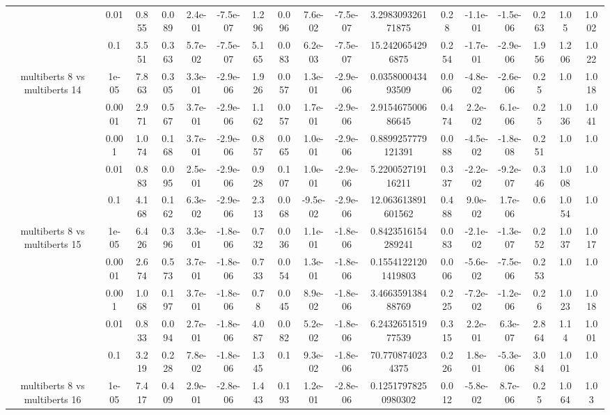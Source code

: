 \begin{tabular}{|c|c|c|c|c|c|c|c|c|c|c|c|c|c|c|c|c|}
 & 0.01 & 0.855 & 0.089 & 2.4e-01 & -7.5e-07 & 1.296 & 0.096 & 7.6e-02 & -7.5e-07 & 3.298309326171875 & 0.28 & -1.1e-01 & -1.5e-06 & 0.263 & 1.05 & 1.002 \\
 & 0.1 & 3.551 & 0.363 & 5.7e-02 & -7.5e-07 & 5.165 & 0.083 & 6.2e-03 & -7.5e-07 & 15.2420654296875 & 0.254 & -1.7e-01 & -2.9e-06 & 1.956 & 1.206 & 1.022 \\
\hline
\multirow{5}{*}{multiberts 8 vs multiberts 14} & 1e-05 & 7.863 & 0.305 & 3.3e-01 & -2.9e-06 & 1.926 & 0.057 & 1.3e-01 & -2.9e-06 & 0.035800043493509 & 0.006 & -4.8e-02 & -2.6e-06 & 0.25 & 1.0 & 1.018 \\
 & 0.0001 & 2.971 & 0.567 & 3.7e-01 & -2.9e-06 & 1.162 & 0.057 & 1.7e-01 & -2.9e-06 & 2.915467500686645 & 0.474 & 2.2e-02 & 6.1e-06 & 0.25 & 1.036 & 1.041 \\
 & 0.001 & 1.074 & 0.168 & 3.7e-01 & -2.9e-06 & 0.857 & 0.065 & 1.0e-01 & -2.9e-06 & 0.8899257779121391 & 0.088 & -4.5e-02 & -1.8e-08 & 0.251 & 1.0 & 1.0 \\
 & 0.01 & 0.883 & 0.095 & 2.5e-01 & -2.9e-06 & 0.928 & 0.107 & 1.0e-01 & -2.9e-06 & 5.220052719116211 & 0.337 & -2.2e-02 & -9.2e-07 & 0.346 & 1.008 & 1.0 \\
 & 0.1 & 4.168 & 0.162 & 6.3e-02 & -2.9e-06 & 2.313 & 0.068 & -9.5e-02 & -2.9e-06 & 12.063613891601562 & 0.488 & 9.0e-02 & 1.7e-06 & 0.6 & 1.054 & 1.0 \\
\hline
\multirow{5}{*}{multiberts 8 vs multiberts 15} & 1e-05 & 6.426 & 0.396 & 3.3e-01 & -1.8e-06 & 0.732 & 0.036 & 1.1e-01 & -1.8e-06 & 0.8423516154289241 & 0.083 & -2.1e-02 & -1.3e-07 & 0.252 & 1.037 & 1.017 \\
 & 0.0001 & 2.674 & 0.573 & 3.7e-01 & -1.8e-06 & 0.733 & 0.054 & 1.3e-01 & -1.8e-06 & 0.15541221201419803 & 0.006 & -5.6e-02 & -7.5e-06 & 0.253 & 1.0 & 1.0 \\
 & 0.001 & 1.068 & 0.197 & 3.7e-01 & -1.8e-06 & 0.78 & 0.045 & 8.9e-02 & -1.8e-06 & 3.466359138488769 & 0.225 & -7.2e-02 & -1.2e-06 & 0.26 & 1.023 & 1.018 \\
 & 0.01 & 0.833 & 0.094 & 2.7e-01 & -1.8e-06 & 4.087 & 0.082 & 5.2e-02 & -1.8e-06 & 6.243265151977539 & 0.315 & 2.2e-01 & 6.3e-07 & 2.864 & 1.14 & 1.001 \\
 & 0.1 & 3.219 & 0.228 & 7.8e-02 & -1.8e-06 & 1.345 & 0.1 & 9.3e-02 & -1.8e-06 & 70.7708740234375 & 0.226 & 1.8e-01 & -5.3e-06 & 3.084 & 1.001 & 1.0 \\
\hline
\multirow{5}{*}{multiberts 8 vs multiberts 16} & 1e-05 & 7.417 & 0.409 & 2.9e-01 & -2.8e-06 & 1.443 & 0.193 & 1.2e-01 & -2.8e-06 & 0.12517978250980302 & 0.012 & -5.8e-02 & 8.7e-06 & 0.25 & 1.064 & 1.03 \\

\end{tabular}
